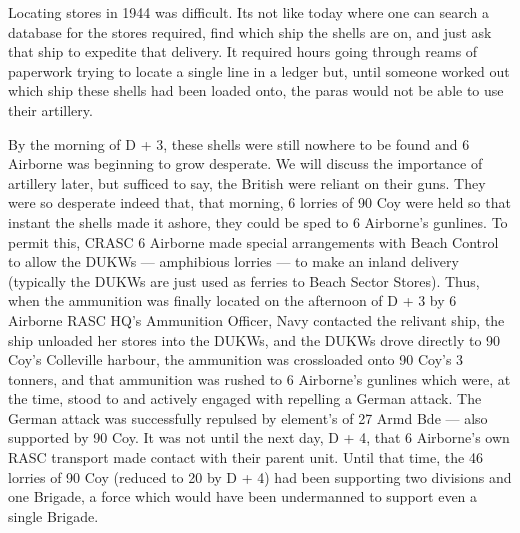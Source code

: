 \documentclass[noraggedright]{turabian-researchpaper}
\begin{document}
Locating stores in 1944 was difficult.  Its not like today where one can 
search a database for the stores required, find which ship the shells are on, 
and just ask that ship to expedite that delivery.  It required hours going 
through reams of paperwork trying to locate a single line in a ledger but, 
until 
someone worked out which ship these shells had been loaded onto, the paras
would not be able to use their artillery. 

By the morning of D + 3, these shells were still nowhere to be found and 6
Airborne was beginning to grow desperate.  We will discuss the importance of
artillery later, but sufficed to say, the British were reliant on their
guns.  They were so desperate indeed that, that morning, 6 lorries of 90 Coy
were held so that instant the shells made it 
ashore, they could be sped to 6 Airborne's gunlines.  To permit this, CRASC
6 Airborne made special arrangements with Beach Control to allow the DUKWs
--- amphibious lorries --- to make an inland delivery (typically the DUKWs
are just used as ferries to Beach Sector Stores).  %
Thus, when the ammunition was finally located on the afternoon of D + 3 by
6 Airborne RASC HQ's Ammunition Officer, Navy contacted the relivant ship,
the ship unloaded her stores into the DUKWs, and the
DUKWs drove directly to 90 Coy's Colleville harbour, the ammunition was 
crossloaded onto 90 Coy's 3 tonners, and that ammunition was rushed to 6
Airborne's gunlines which were, at the time, stood to and actively engaged 
with repelling a German attack.\autocite[7-8]{90wdjun}
The German attack was successfully repulsed
by element's of 27 Armd Bde --- also supported by 90 Coy.  It was not until 
the next day, D + 4, that 6 Airborne's own RASC transport made contact with
their parent unit.  Until that time, the 46 lorries of 90 Coy (reduced to 20 
by D + 4) had been supporting two divisions and one Brigade, a force which 
would have been undermanned to support even a single Brigade.  
\end{document}
